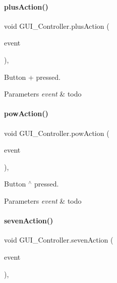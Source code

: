 \paragraph{\texorpdfstring{plus\+Action()}{plusAction()}}
{\footnotesize\ttfamily void G\+U\+I\+\_\+\+Controller.\+plus\+Action (\begin{DoxyParamCaption}\item[{Action\+Event}]{event }\end{DoxyParamCaption})\hspace{0.3cm}{\ttfamily [inline]}, {\ttfamily [private]}}



Button \textquotesingle{}+\textquotesingle{} pressed. 


\begin{DoxyParams}{Parameters}
{\em event} & todo \\
\hline
\end{DoxyParams}
\mbox{\label{classGUI__Controller_a5d06ebc913880c0166c64ce44820ede5}} 
\paragraph{\texorpdfstring{pow\+Action()}{powAction()}}
{\footnotesize\ttfamily void G\+U\+I\+\_\+\+Controller.\+pow\+Action (\begin{DoxyParamCaption}\item[{Action\+Event}]{event }\end{DoxyParamCaption})\hspace{0.3cm}{\ttfamily [inline]}, {\ttfamily [private]}}



Button \textquotesingle{}$^\wedge$\textquotesingle{} pressed. 


\begin{DoxyParams}{Parameters}
{\em event} & todo \\
\hline
\end{DoxyParams}
\mbox{\label{classGUI__Controller_a4eece09e941a48b35c7c4e067ee02317}} 
\paragraph{\texorpdfstring{seven\+Action()}{sevenAction()}}
{\footnotesize\ttfamily void G\+U\+I\+\_\+\+Controller.\+seven\+Action (\begin{DoxyParamCaption}\item[{Action\+Event}]{event }\end{DoxyParamCaption})\hspace{0.3cm}{\ttfamily [inline]}, {\ttfamily [private]}}



